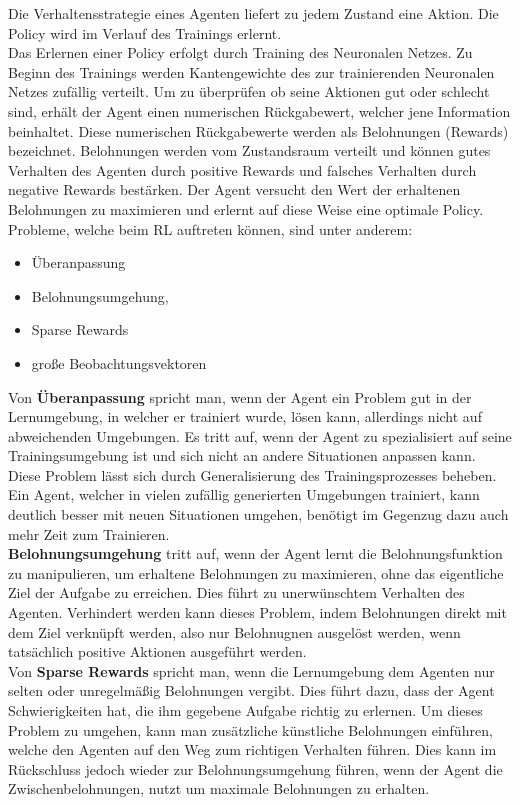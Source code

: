 Die Verhaltensstrategie  eines Agenten liefert zu jedem Zustand eine Aktion. Die Policy wird im Verlauf des Trainings erlernt.\\
Das Erlernen einer Policy erfolgt durch Training des Neuronalen Netzes. Zu Beginn des Trainings werden Kantengewichte des zur trainierenden Neuronalen Netzes zufällig verteilt. Um zu überprüfen ob seine Aktionen gut oder schlecht sind, erhält der Agent einen numerischen Rückgabewert, welcher jene Information beinhaltet. Diese numerischen Rückgabewerte werden als Belohnungen (Rewards) bezeichnet. Belohnungen werden vom Zustandsraum verteilt und können gutes Verhalten des Agenten durch positive Rewards und falsches Verhalten durch negative Rewards bestärken.
Der Agent versucht den Wert der erhaltenen Belohnungen zu maximieren und erlernt auf diese Weise eine optimale Policy. \\
\newpage
Probleme, welche beim RL auftreten können, sind unter anderem:  
\begin{itemize}
    \item Überanpassung 
    \item Belohnungsumgehung, 
    \item Sparse Rewards
    \item große Beobachtungsvektoren
\end{itemize}
Von \textbf{Überanpassung} spricht man, wenn der Agent ein Problem gut in der Lernumgebung, in welcher er trainiert wurde, lösen kann, allerdings nicht auf abweichenden Umgebungen. Es tritt auf, wenn der Agent zu spezialisiert auf seine Trainingsumgebung ist und sich nicht an andere Situationen anpassen kann. Diese Problem lässt sich durch Generalisierung des Trainingsprozesses beheben. Ein Agent, welcher in vielen zufällig generierten Umgebungen trainiert, kann deutlich besser mit neuen Situationen umgehen, benötigt im Gegenzug dazu auch mehr Zeit zum Trainieren. \cite{zhang_study_2018} \\
\textbf{Belohnungsumgehung} tritt auf, wenn der Agent lernt die Belohnungsfunktion zu manipulieren, um erhaltene Belohnungen zu maximieren, ohne das eigentliche Ziel der Aufgabe zu erreichen. Dies führt zu unerwünschtem Verhalten des Agenten. Verhindert werden kann dieses Problem, indem Belohnungen direkt mit dem Ziel verknüpft werden, also nur Belohnugnen ausgelöst werden, wenn tatsächlich positive Aktionen ausgeführt werden. \cite{pan_effects_2022} \\
Von \textbf{Sparse Rewards} spricht man, wenn die Lernumgebung dem Agenten nur selten oder unregelmäßig Belohnungen vergibt. Dies führt dazu, dass der Agent Schwierigkeiten hat, die ihm gegebene Aufgabe richtig zu erlernen. Um dieses Problem zu umgehen, kann man zusätzliche künstliche Belohnungen einführen, welche den Agenten auf den Weg zum richtigen Verhalten führen. Dies kann im Rückschluss jedoch wieder zur Belohnungsumgehung führen, wenn der Agent die Zwischenbelohnungen, nutzt um maximale Belohnungen zu erhalten. \cite{hare_dealing_2019} \\
